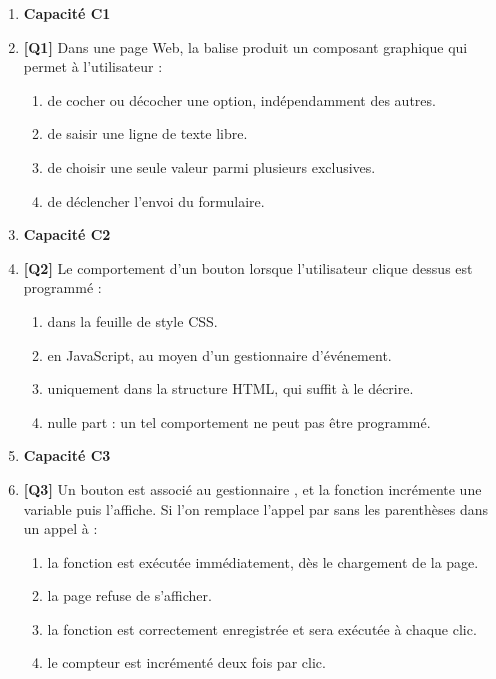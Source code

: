 \begin{enumerate}

\item[] \textbf{Capacité C1}

\item \textbf{[Q1]} Dans une page Web, la balise  produit un composant graphique qui permet à l'utilisateur :
  \begin{enumerate}[label=\Alph*.]
    \item de cocher ou décocher une option, indépendamment des autres.
    \item de saisir une ligne de texte libre.
    \item de choisir une seule valeur parmi plusieurs exclusives.
    \item de déclencher l'envoi du formulaire.
  \end{enumerate}

\item[] \textbf{Capacité C2}

\item \textbf{[Q2]} Le comportement d'un bouton lorsque l'utilisateur clique dessus est programmé :
  \begin{enumerate}[label=\Alph*.]
    \item dans la feuille de style CSS.
    \item en JavaScript, au moyen d'un gestionnaire d'événement.
    \item uniquement dans la structure HTML, qui suffit à le décrire.
    \item nulle part : un tel comportement ne peut pas être programmé.
  \end{enumerate}

\item[] \textbf{Capacité C3}

\item \textbf{[Q3]} Un bouton est associé au gestionnaire , et la fonction  incrémente une variable puis l'affiche. Si l'on remplace l'appel par  sans les parenthèses dans un appel à  :
  \begin{enumerate}[label=\Alph*.]
    \item la fonction est exécutée immédiatement, dès le chargement de la page.
    \item la page refuse de s'afficher.
    \item la fonction est correctement enregistrée et sera exécutée à chaque clic.
    \item le compteur est incrémenté deux fois par clic.
  \end{enumerate}


\end{enumerate}
